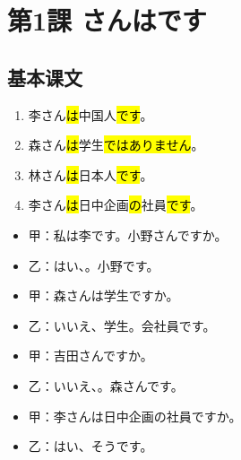 \section{第1課 さんはです}


\subsection{基本课文}

\begin{enumerate}
    \item 李さん\hl{は}中国人\hl{です}。
    \item 森さん\hl{は}学生\hl{ではありません}。
    \item 林さん\hl{は}日本人\hl{です}。
    \item 李さん\hl{は}日中企画\hl{の}社員\hl{です}。
\end{enumerate}


\begin{itemize}
    \item 甲：私は李です。小野さんですか。
    \item 乙：はい、。小野です。
\end{itemize}

\begin{itemize}
    \item 甲：森さんは学生ですか。
    \item 乙：いいえ、学生。会社員です。
\end{itemize}

\begin{itemize}
    \item 甲：吉田さんですか。
    \item 乙：いいえ、。森さんです。
\end{itemize}

\begin{itemize}
    \item 甲：李さんは日中企画の社員ですか。
    \item 乙：はい、そうです。
\end{itemize}

